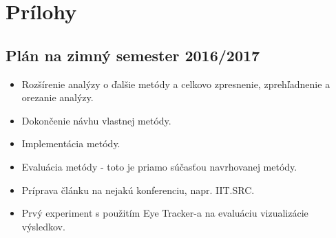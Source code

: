 \label{app.01}
\appendix
\chapter*{Prílohy}
\renewcommand{\thesection}{\Alph{section}}


\section{Plán na zimný semester 2016/2017}\label{plan}
\begin{itemize}
	\item Rozšírenie analýzy o ďalšie metódy a celkovo zpresnenie, zprehľadnenie a orezanie analýzy.
	\item Dokončenie návhu vlastnej metódy.
	\item Implementácia metódy.
	\item Evaluácia metódy - toto je priamo súčasťou navrhovanej metódy.
	\item Príprava článku na nejakú konferenciu, napr. IIT.SRC.
	\item Prvý experiment s použitím Eye Tracker-a na evaluáciu vizualizácie výsledkov.
\end{itemize}

